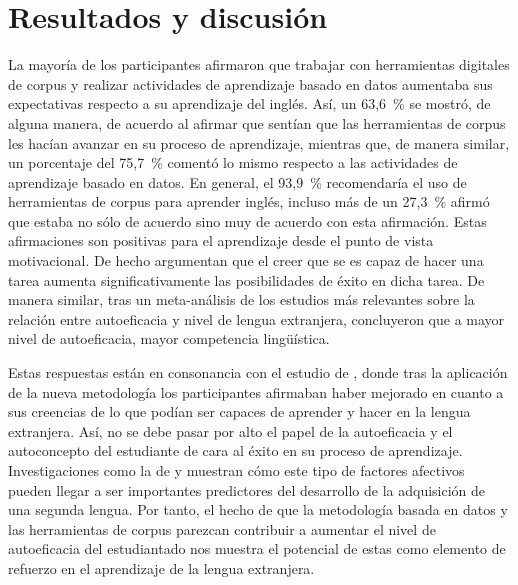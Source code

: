 \section{Resultados y discusión}\label{sec-resultadosydiscusión}

La mayoría de los participantes afirmaron que trabajar con herramientas
digitales de corpus y realizar actividades de aprendizaje basado en
datos aumentaba sus expectativas respecto a su aprendizaje del inglés.
Así, un 63,6~\% se mostró, de alguna manera, de acuerdo al afirmar que
sentían que las herramientas de corpus les hacían avanzar en su proceso
de aprendizaje, mientras que, de manera similar, un porcentaje del 75,7~\% comentó lo mismo respecto a las actividades de aprendizaje basado en
datos. En general, el 93,9~\% recomendaría el uso de herramientas de
corpus para aprender inglés, incluso más de un 27,3~\% afirmó que estaba
no sólo de acuerdo sino muy de acuerdo con esta afirmación. Estas
afirmaciones son positivas para el aprendizaje desde el punto de vista
motivacional. De hecho \textcite{raoofi2012self} argumentan que el
creer que se es capaz de hacer una tarea aumenta significativamente las
posibilidades de éxito en dicha tarea. De manera similar, tras un
meta-análisis de los estudios más relevantes sobre la relación entre
autoeficacia y nivel de lengua extranjera, \textcite{wang2020} concluyeron
que a mayor nivel de autoeficacia, mayor competencia lingüística.

Estas respuestas están en consonancia con el estudio de \textcite{lin2016effects},
donde tras la aplicación de la nueva metodología los participantes
afirmaban haber mejorado en cuanto a sus creencias de lo que podían ser
capaces de aprender y hacer en la lengua extranjera. Así, no se debe
pasar por alto el papel de la autoeficacia y el autoconcepto del
estudiante de cara al éxito en su proceso de aprendizaje.
Investigaciones como la de \textcite{sun2020college} y \textcite{genc2016exploring}
muestran cómo este tipo de factores afectivos pueden llegar a ser
importantes predictores del desarrollo de la adquisición de una segunda
lengua. Por tanto, el hecho de que la metodología basada en datos y las
herramientas de corpus parezcan contribuir a aumentar el nivel de
autoeficacia del estudiantado nos muestra el potencial de estas como
elemento de refuerzo en el aprendizaje de la lengua extranjera.

